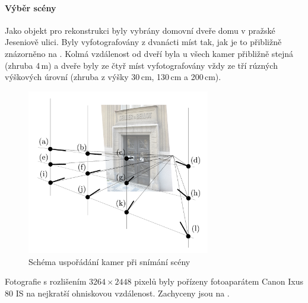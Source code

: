 \documentclass[11pt,oneside,a4paper,pdftex]{article}   %
\begin{document}
\paragraph{Výběr scény}
Jako objekt pro rekonstrukci byly vybrány domovní dveře domu v pražské Jeseniově ulici. Byly
vyfotografovány z dvanácti míst tak, jak je to přibližně znázorněno na .
Kolmá vzdálenost od dveří byla u všech kamer přibližně stejná (zhruba 4\,m) a dveře byly ze čtyř
míst vyfotografovány vždy ze tří rúzných výškových úrovní (zhruba z výšky 30\,cm, 130\,cm a
200\,cm).
	\begin{figure}[htb]
		\centering
		\includegraphics[width=8cm]{pictures/usporadani_kamer.pdf}
		\caption{Schéma uspořádání kamer při snímání scény}
		\label{fig:usporadaniKamer}
	\end{figure}
Fotografie s rozlišením $3264\times2448$ pixelů byly pořízeny fotoaparátem Canon Ixus 80
IS na nejkratší ohniskovou vzdálenost. Zachyceny jsou na .
\end{document}
